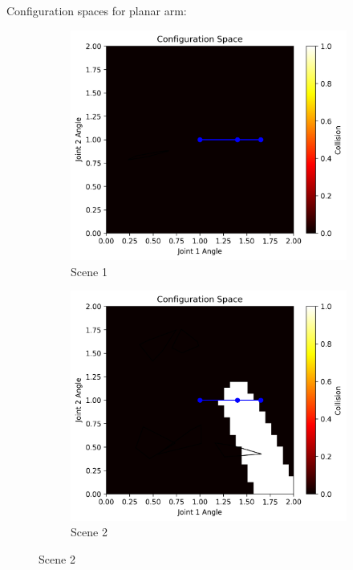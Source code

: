 \documentclass{article}
\begin{document}
Configuration spaces for planar arm:
\begin{figure}[h!]
    \centering
    \begin{subfigure}{0.45\textwidth}
        \includegraphics[width=\textwidth]{config_space_scene1.png}
        \caption{Scene 1}
    \end{subfigure}
    \hfill
    \begin{subfigure}{0.45\textwidth}
        \includegraphics[width=\textwidth]{config_space_scene2.png}
        \caption{Scene 2}
    \end{subfigure}

\end{figure}
\end{document}
